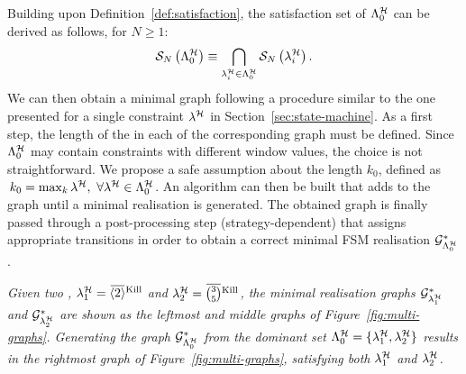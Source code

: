 Building upon Definition~\ref{def:satisfaction}, the satisfaction set of $\Lambda^{\mathcal{H}}_0$ can be derived as follows, for $N\geq 1$:
%
\begin{equation}
    \label{eq:satisfaction-multi}
    \mathcal{S}_{N}\left( \Lambda^{\mathcal{H}}_0 \right) \equiv \bigcap_{\lambda^{\mathcal{H}}_i \in \Lambda^{\mathcal{H}}_0} \mathcal{S}_{N}\left( \lambda^{\mathcal{H}}_i \right).
\end{equation}
%
We can then obtain a minimal graph  following a procedure similar to the one presented for a single constraint $\lambda^{\mathcal{H}}$ in Section~\ref{sec:state-machine}.
As a first step, the length of the  in each  of the corresponding graph must be defined.
Since $\Lambda^{\mathcal{H}}_0$ may contain constraints with different window values, the choice is not straightforward.
We propose a safe assumption about the  length $k_0$, defined as $\,k_0 = \max_{k} \lambda^{\mathcal{H}},\,\, \forall \lambda^{\mathcal{H}} \in \Lambda^{\mathcal{H}}_0$.
An algorithm can then be built that adds  to the graph until a minimal realisation is generated.
The obtained graph is finally passed through a post-processing step (strategy-dependent) that assigns  appropriate transitions in order to obtain a correct minimal FSM realisation $\mathcal{G}_{\Lambda^{\mathcal{H}}_0}^*$.

\begin{example}%
    \label{ex:auto-comb}%
    \emph{Given two \ewhc{},} $\lambda^{\strat}_1 = \overbar{\left<2\right>}^{\text{Kill}}$\emph{ and } $\lambda^{\strat}_2 = \overbar{\binom{3}{5}}^{\text{Kill}}$\emph{, the minimal realisation graphs $\mathcal{G}_{\lambda^{\mathcal{H}}_1}^*$ and $\mathcal{G}_{\lambda^{\mathcal{H}}_2}^*$ are shown as the leftmost and middle graphs of Figure~\ref{fig:multi-graphs}.
    Generating the graph $\mathcal{G}_{\Lambda^{\mathcal{H}}_0}^*$ from the dominant set $\Lambda^{\mathcal{H}}_0 = \{ \lambda^{\mathcal{H}}_1, \lambda^{\mathcal{H}}_2 \}$ results in the rightmost graph of Figure~\ref{fig:multi-graphs}, satisfying both $\lambda^{\mathcal{H}}_1$ and $\lambda^{\mathcal{H}}_2$.}
\end{example}


